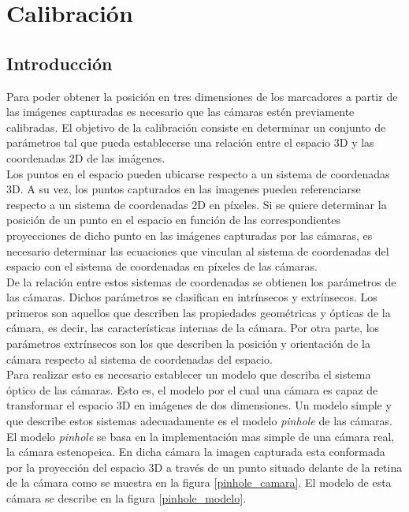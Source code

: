 

\section{Calibración}
\label{calibracion}

\subsection{Introducción}
Para poder obtener la posición en tres dimensiones de los marcadores a partir de las imágenes capturadas es necesario que las cámaras estén previamente calibradas. El objetivo de la calibración consiste en determinar un conjunto de parámetros tal que pueda establecerse una relación entre el espacio 3D y las coordenadas 2D de las imágenes.\\

Los puntos en el espacio pueden ubicarse respecto a un sistema de coordenadas 3D. A su vez, los puntos capturados en las imagenes pueden referenciarse respecto a un sistema de coordenadas 2D en píxeles. Si se quiere determinar la posición de un punto en el espacio en función de las correspondientes proyecciones de dicho punto en las imágenes capturadas por las cámaras, es necesario determinar las ecuaciones que vinculan al sistema de coordenadas del espacio con el sistema de coordenadas en píxeles de las cámaras.\\

De la relación entre estos sistemas de coordenadas se obtienen los parámetros de las cámaras. Dichos parámetros se clasifican en intrínsecos y extrínsecos. Los primeros son aquellos que describen las propiedades geométricas y ópticas de la cámara, es decir, las características internas de la cámara. Por otra parte, los parámetros extrínsecos son los que describen la posición y orientación de la cámara respecto al sistema de coordenadas del espacio.\\

Para realizar esto es necesario establecer un modelo que describa el sistema óptico de las cámaras. Esto es, el modelo por el cual una cámara es capaz de transformar el espacio 3D en imágenes de dos dimensiones. Un modelo simple y que describe estos sistemas adecuadamente es el modelo \textit{pinhole} de las cámaras. 
El modelo \textit{pinhole} se basa en la implementación mas simple de una cámara real, la cámara estenopeica. En dicha cámara la imagen capturada esta conformada por la proyección del espacio 3D a través de un punto situado delante de la retina de la cámara como se muestra en la figura \ref{pinhole_camara}. El modelo de esta cámara se describe en la figura \ref{pinhole_modelo}.\\


